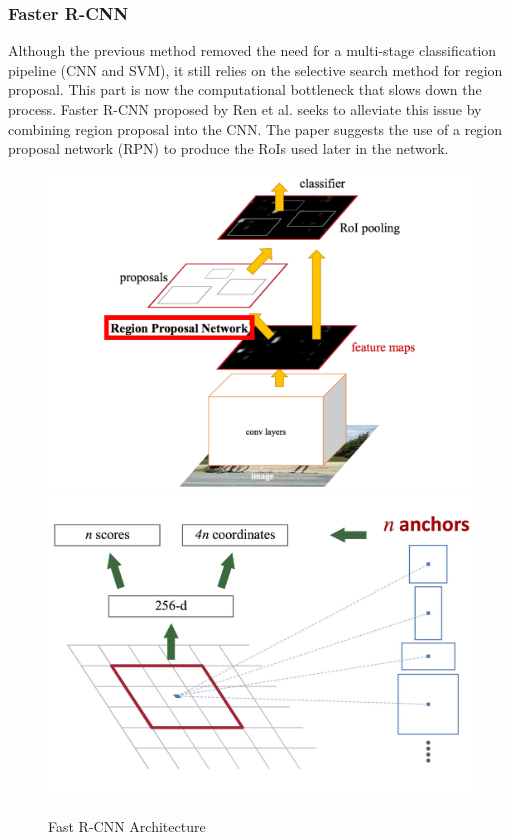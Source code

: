 \documentclass[11pt,twoside]{report}
\begin{document}
\subsubsection{Faster R-CNN} \label{Faster_rcnn}
Although the previous method \cite{DBLP:journals/corr/Girshick15} removed the need for a multi-stage classification pipeline (CNN and SVM), it still relies on the selective search \cite{Uijlings2013} method for region proposal. This part is now the computational bottleneck that slows down the process. Faster R-CNN proposed by Ren et al. \cite{DBLP:journals/corr/RenHG015} seeks to alleviate this issue by combining region proposal into the CNN. The paper suggests the use of a region proposal network (RPN) to produce the RoIs used later in the network. 

\noindent \begin{figure}[h!]
	\includegraphics[width = 0.45\hsize]{./figures/faster.png}
	\includegraphics[width = 0.45\hsize]{./figures/rpn_faster.jpg}
	\caption{Fast R-CNN Architecture \cite{DBLP:journals/corr/Girshick15}}
	\label{Faster_rnn_fig}
\end{figure}
\end{document}
